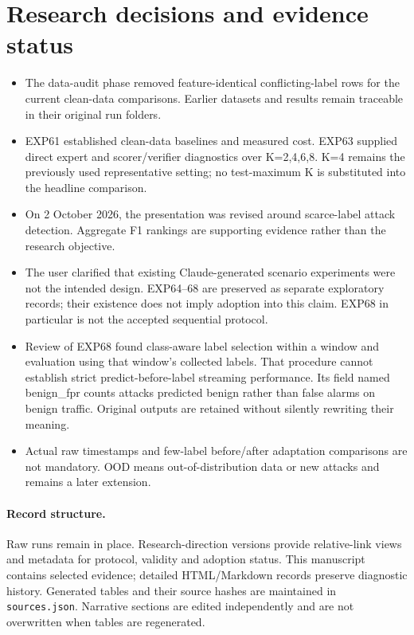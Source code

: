 \section{Research decisions and evidence status}
\begin{itemize}
\item The data-audit phase removed feature-identical conflicting-label rows for the current clean-data comparisons. Earlier datasets and results remain traceable in their original run folders.
\item EXP61 established clean-data baselines and measured cost. EXP63 supplied direct expert and scorer/verifier diagnostics over K=2,4,6,8. K=4 remains the previously used representative setting; no test-maximum K is substituted into the headline comparison.
\item On 2 October 2026, the presentation was revised around scarce-label attack detection. Aggregate F1 rankings are supporting evidence rather than the research objective.
\item The user clarified that existing Claude-generated scenario experiments were not the intended design. EXP64--68 are preserved as separate exploratory records; their existence does not imply adoption into this claim. EXP68 in particular is not the accepted sequential protocol.
\item Review of EXP68 found class-aware label selection within a window and evaluation using that window's collected labels. That procedure cannot establish strict predict-before-label streaming performance. Its field named benign\_fpr counts attacks predicted benign rather than false alarms on benign traffic. Original outputs are retained without silently rewriting their meaning.
\item Actual raw timestamps and few-label before/after adaptation comparisons are not mandatory. OOD means out-of-distribution data or new attacks and remains a later extension.
\end{itemize}
\paragraph{Record structure.} Raw runs remain in place. Research-direction versions provide relative-link views and metadata for protocol, validity and adoption status. This manuscript contains selected evidence; detailed HTML/Markdown records preserve diagnostic history. Generated tables and their source hashes are maintained in \texttt{sources.json}. Narrative sections are edited independently and are not overwritten when tables are regenerated.
